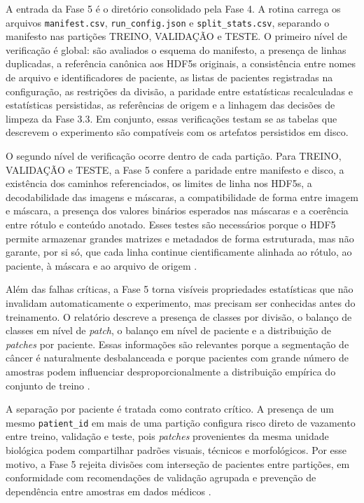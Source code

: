A entrada da Fase 5 é o diretório consolidado pela Fase 4. A rotina carrega os arquivos
\texttt{manifest.csv}, \texttt{run\_config.json} e
\texttt{split\_stats.csv}, separando o manifesto nas partições
TREINO, VALIDAÇÃO e TESTE. O primeiro nível de
verificação é global: são avaliados o esquema do manifesto, a presença de linhas
duplicadas, a referência canônica aos HDF5s originais, a consistência entre nomes
de arquivo e identificadores de paciente, as listas de pacientes registradas na
configuração, as restrições da divisão, a paridade entre estatísticas
recalculadas e estatísticas persistidas, as referências de origem e a linhagem
das decisões de limpeza da Fase 3.3. Em conjunto, essas verificações testam se as
tabelas que descrevem o experimento são compatíveis com os artefatos persistidos
em disco.

O segundo nível de verificação ocorre dentro de cada partição. Para
TREINO, VALIDAÇÃO e TESTE, a Fase 5 confere a paridade
entre manifesto e disco, a existência dos caminhos referenciados, os limites de
linha nos HDF5s, a decodabilidade das imagens e máscaras, a compatibilidade de
forma entre imagem e máscara, a presença dos valores binários esperados nas
máscaras e a coerência entre rótulo e conteúdo anotado. Esses testes são
necessários porque o HDF5 permite armazenar grandes matrizes e metadados de forma
estruturada, mas não garante, por si só, que cada linha continue cientificamente
alinhada ao rótulo, ao paciente, à máscara e ao arquivo de origem
\cite{folk2011hdf5,yu2020noisy}.

Além das falhas críticas, a Fase 5 torna visíveis propriedades estatísticas que
não invalidam automaticamente o experimento, mas precisam ser conhecidas antes do
treinamento. O relatório descreve a presença de classes por divisão, o balanço de
classes em nível de \textit{patch}, o balanço em nível de paciente e a
distribuição de \textit{patches} por paciente. Essas informações são relevantes
porque a segmentação de câncer é naturalmente desbalanceada e porque pacientes
com grande número de amostras podem influenciar desproporcionalmente a
distribuição empírica do conjunto de treino \cite{he2009imbalanced}.

A separação por paciente é tratada como contrato crítico. A presença de um mesmo
\texttt{patient\_id} em mais de uma partição configura risco direto de vazamento
entre treino, validação e teste, pois \textit{patches} provenientes da mesma
unidade biológica podem compartilhar padrões visuais, técnicos e morfológicos.
Por esse motivo, a Fase 5 rejeita divisões com interseção de pacientes entre
partições, em conformidade com recomendações de validação agrupada e prevenção
de dependência entre amostras em dados médicos
\cite{roberts2017crossvalidation,dawood2026confounding}.

